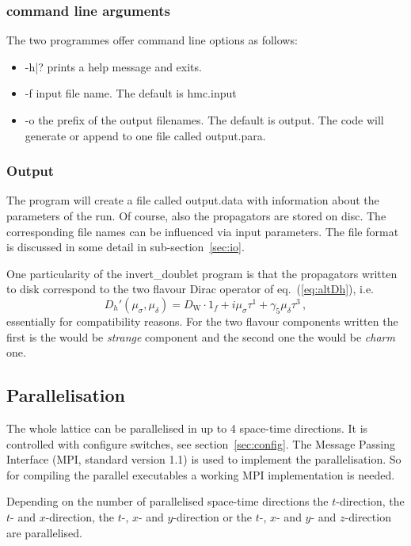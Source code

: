\subsubsection{command line arguments}

The two programmes offer command line options as follows:
\begin{itemize}
\item {\ttfamily -h|?} prints a help message and exits.
\item {\ttfamily -f} input file name. The default is {\ttfamily
    hmc.input}
\item {\ttfamily -o} the prefix of the output filenames. The default is
  {\ttfamily output}. The code will generate or append to one file
  called {\ttfamily output.para}.
\end{itemize}

\subsubsection{Output}

The program will create a file called {\ttfamily output.data} with
information about the parameters of the run. 
Of course, also the propagators are stored on disc. The corresponding
file names can be influenced via input parameters. The file format
is discussed in some detail in sub-section~\ref{sec:io}.

One particularity of the {\ttfamily invert\_doublet} program is that
the propagators written to disk correspond to the two flavour Dirac
operator of eq.~(\ref{eq:altDh}), i.e.
\[
D_h'(\mu_\sigma,\mu_\delta) = D_\mathrm{W}\cdot 1_f +
i\mu_\sigma\tau^1 + \gamma_5 \mu_\delta \tau^3\, ,
\]
essentially for compatibility reasons. For the two flavour components
written the first is the would be \emph{strange} component and the
second one the would be \emph{charm} one.                             

\subsection{Parallelisation}

The whole lattice can be parallelised in up to 4 space-time directions.
It is controlled with configure switches, see section~\ref{sec:config}.
The Message Passing Interface (MPI, standard version 1.1)  is used to
implement the parallelisation. So for compiling the parallel
executables a working MPI implementation is needed.

Depending on the number of parallelised space-time directions the
$t$-direction, the $t$- and $x$-direction, the $t$-, $x$- and
$y$-direction or the $t$-, $x$- and $y$- and $z$-direction are
parallelised. 

